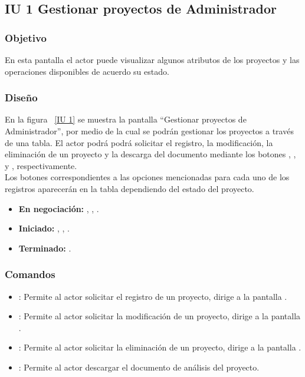\subsection{IU 1 Gestionar proyectos de Administrador}
\subsubsection{Objetivo}
	
	En esta pantalla el actor puede visualizar algunos atributos de los proyectos y las operaciones disponibles de acuerdo su estado.

\subsubsection{Diseño}

    En la figura ~\ref{IU 1} se muestra la pantalla ``Gestionar proyectos de Administrador'', por medio de la cual 
    se podrán gestionar los proyectos a través de una tabla. El actor podrá podrá solicitar el registro, la modificación, la eliminación 
    de un proyecto y la descarga del documento mediante los botones
    , \btnEditar, \btnEliminar y  \btnDescargarDoc, respectivamente. \\
    
    Los botones correspondientes a las opciones mencionadas para cada uno de los registros aparecerán en la tabla dependiendo del estado
    del proyecto.
    	
    \begin{itemize}
	    \item {\bf En negociación:} \btnDescargarDoc, \btnEditar, \btnEliminar.
	    \item {\bf Iniciado:} \btnDescargarDoc, \btnEditar, \btnEliminar.
            \item {\bf Terminado:} \btnDescargarDoc.
    \end{itemize}



\subsubsection{Comandos}
\begin{itemize}
	\item {}: Permite al actor solicitar el registro de un proyecto, dirige a la pantalla .
	\item \btnEditar[Modificar]: Permite al actor solicitar la modificación de un proyecto, dirige a la pantalla .
	\item \btnEliminar[Eliminar]: Permite al actor solicitar la eliminación de un proyecto, dirige a la pantalla .
	\item {}: Permite al actor descargar el documento de análisis del proyecto.
\end{itemize}
